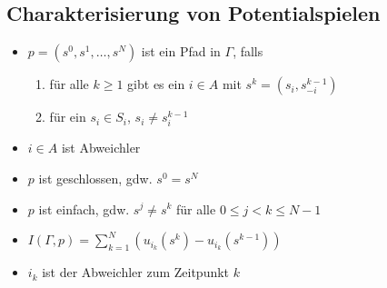 \subsection{Charakterisierung von Potentialspielen}
	\begin{itemize}
		\item $p=(s^0,s^1,\dots,s^N)$ ist ein Pfad in $\Gamma$, falls
			\begin{enumerate}
				\item für alle $k\geq 1$ gibt es ein $i\in A$ mit $s^k = (s_i,s_{-i}^{k-1})$
				\item für ein $s_i\in S_i$, $s_i\neq s_i^{k-1}$
			\end{enumerate}
		\item $i\in A$ ist Abweichler
		\item $p$ ist geschlossen, gdw. $s^0=s^N$
		\item $p$ ist einfach, gdw. $s^j\neq s^k$ für alle $0\leq j<k\leq N-1$
		\item $I(\Gamma,p)=\sum\limits_{k=1}^N\left(u_{i_k}(s^k)-u_{i_k}(s^{k-1})\right)$
		\item $i_k$ ist der Abweichler zum Zeitpunkt $k$
	\end{itemize}
\topbreak
